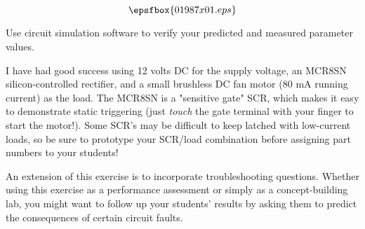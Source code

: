 

$$\epsfbox{01987x01.eps}$$

\vfil \eject






Use circuit simulation software to verify your predicted and measured parameter values.







I have had good success using 12 volts DC for the supply voltage, an MCR8SN silicon-controlled rectifier, and a small brushless DC fan motor (80 mA running current) as the load.  The MCR8SN is a "sensitive gate" SCR, which makes it easy to demonstrate static triggering (just {\it touch} the gate terminal with your finger to start the motor!).  Some SCR's may be difficult to keep latched with low-current loads, so be sure to prototype your SCR/load combination before assigning part numbers to your students!

An extension of this exercise is to incorporate troubleshooting questions.  Whether using this exercise as a performance assessment or simply as a concept-building lab, you might want to follow up your students' results by asking them to predict the consequences of certain circuit faults.




